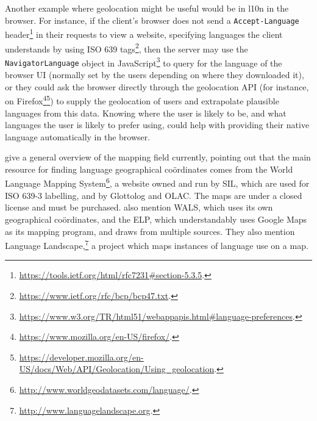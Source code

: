 Another example where geolocation might be useful would be in l10n in the browser. For instance, if the client's browser does not send a {\tt Accept-Language} header\footnote{\href{https://tools.ietf.org/html/rfc7231\#section-5.3.5}{https://tools.ietf.org/html/rfc7231\#section-5.3.5}. } in their requests to view a website, specifying languages the client understands by using ISO 639 tags\footnote{\href{https://www.ietf.org/rfc/bcp/bcp47.txt}{https://www.ietf.org/rfc/bcp/bcp47.txt}. }, then the server may use the {\tt Navigator\-Language} object in JavaScript\footnote{\href{https://www.w3.org/TR/html51/webappapis.html\#language-preferences}{https://www.w3.org/TR/html51/webappapis.html\#language-preferences}. } to query for the language of the browser UI (normally set by the users depending on where they downloaded it), or they could ask the browser directly through the geolocation API (for instance, on Firefox\footnote{\href{https://www.mozilla.org/en-US/firefox/}{https://www.mozilla.org/en-US/firefox/}. }\footnote{\href{https://developer.mozilla.org/en-US/docs/Web/API/Geolocation/Using_geolocation}{https://developer.mozilla.org/en-US/docs/Web/API/Geolocation/Using\_geolocation}. }) to supply the geolocation of users and extrapolate plausible languages from this data. Knowing where the user is likely to be, and what languages the user is likely to prefer using, could help with providing their native language automatically in the browser.

\citet{gawne2016mapmaking} give a general overview of the mapping field currently, pointing out that the main resource for finding language geographical co\"ordinates comes from the World Language Mapping System\footnote{\href{http://www.worldgeodatasets.com/language/.}{http://www.worldgeodatasets.com/language/}. }, a website owned and run by SIL, which are used for ISO 639-3 labelling, and by Glottolog and OLAC. The maps are under a closed license and must be purchased. \citet{gawne2016mapmaking} also mention WALS, which uses its own geographical co\"ordinates, and the ELP, which understandably uses Google Maps as its mapping program, and draws from multiple sources. They also mention Language Landscape,\footnote{\href{http://www.languagelandscape.org/}{http://www.languagelandscape.org}. } a project which maps instances of language use on a map.

